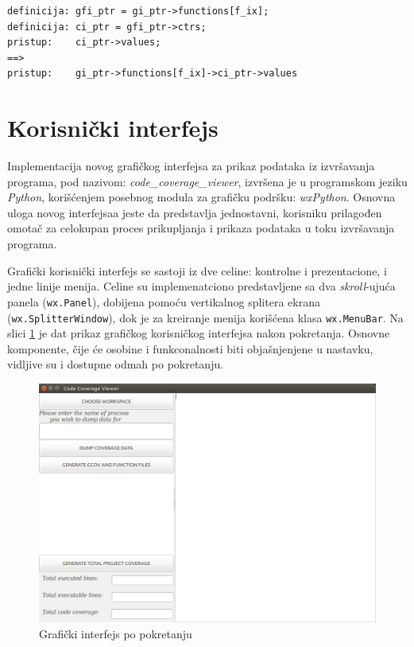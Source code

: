 \documentclass[12pt,oneside]{memoir}
\newcommand{\kod}[1]{\texttt{#1}}
\newcommand{\strano}[1]{\textit{#1}}
\begin{document}
\begin{lstlisting}[caption={Pristup instrumentalitacionim strukturama},frame=single, label=pristup]
definicija: gfi_ptr = gi_ptr->functions[f_ix];
definicija: ci_ptr = gfi_ptr->ctrs;
pristup:    ci_ptr->values;
==>	
pristup:    gi_ptr->functions[f_ix]->ci_ptr->values
\end{lstlisting}

\section{Korisnički interfejs}

Implementacija novog grafičkog interfejsa za prikaz podataka iz izvršavanja programa, pod nazivom: \strano{code\_coverage\_viewer}, izvršena je u programskom jeziku \strano{Python}, korišćenjem posebnog modula za grafičku podršku: \strano{wxPython}. Osnovna uloga novog interfejsaa jeste da predstavlja jednostavni, korisniku prilagođen omotač za celokupan proces prikupljanja i prikaza podataka u toku izvršavanja programa. 

Grafički korisnički interfejs se sastoji iz dve celine: kontrolne i prezentacione, i jedne linije menija. Celine su implemenatciono predstavljene sa dva \strano{skroll}-ujuća panela (\kod{wx.Panel}), dobijena pomoću vertikalnog splitera ekrana (\kod{wx.SplitterWindow}), dok je za kreiranje menija korišćena klasa \kod{wx.MenuBar}. Na slici \ref{fig:GUI1} je dat prikaz grafičkog korisničkog interfejsa nakon pokretanja. Osnovne komponente, čije će osobine i funkconalnosti biti objašnjenjene u  nastavku, vidljive su i dostupne odmah po pokretanju. 

\begin{figure}[!ht]
  \centering
  \includegraphics[width=\textwidth]{img/GUI_1_ng.png}
  \caption{Grafički interfejs po pokretanju}
  \label{fig:GUI1}
\end{figure}
\end{document}
